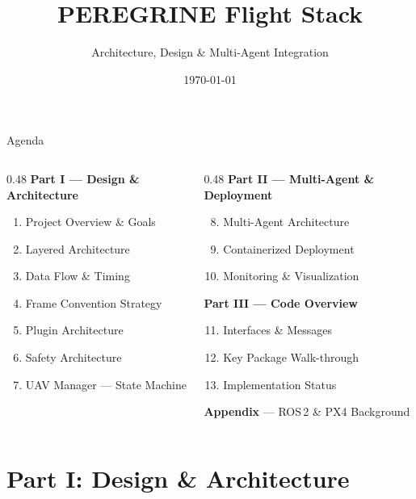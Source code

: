\documentclass[aspectratio=169, 10pt]{beamer}
\title{PEREGRINE Flight Stack}
\subtitle{Architecture, Design \& Multi-Agent Integration}
\date{\today}
\author{}
\institute{}
\begin{document}
\maketitle

\begin{frame}{Agenda}
\begin{columns}[T]
\begin{column}{0.48\textwidth}
\textbf{Part I --- Design \& Architecture}
\begin{enumerate}
  \item Project Overview \& Goals
  \item Layered Architecture
  \item Data Flow \& Timing
  \item Frame Convention Strategy
  \item Plugin Architecture
  \item Safety Architecture
  \item UAV Manager --- State Machine
\end{enumerate}
\end{column}
\begin{column}{0.48\textwidth}
\textbf{Part II --- Multi-Agent \& Deployment}
\begin{enumerate}\setcounter{enumi}{7}
  \item Multi-Agent Architecture
  \item Containerized Deployment
  \item Monitoring \& Visualization
\end{enumerate}
\vspace{0.5em}
\textbf{Part III --- Code Overview}
\begin{enumerate}\setcounter{enumi}{10}
  \item Interfaces \& Messages
  \item Key Package Walk-through
  \item Implementation Status
\end{enumerate}
\vspace{0.5em}
\textbf{Appendix} --- ROS\,2 \& PX4 Background
\end{column}
\end{columns}
\end{frame}


\section{Part I: Design \& Architecture}
\end{document}
